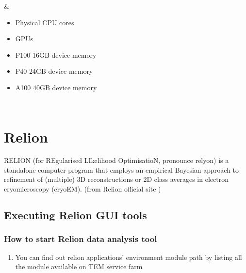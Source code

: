 \documentclass[a4paper,10pt,english]{sphinxmanual}
\begin{document}
\begin{savenotes}
\begin{tabular}[t]{*{4}{}}
\begin{itemize}
\end{itemize}
&\begin{itemize}
\item {} 
 Physical CPU cores

\item {} 
 GPUs

\item {} 
\sphinxAtStartPar
P100 16GB device memory

\item {} 
\sphinxAtStartPar
P40 24GB device memory

\item {} 
\sphinxAtStartPar
A100 40GB device memory

\end{itemize}
\\
\sphinxbottomrule
\end{tabular}
\sphinxtableafterendhook\par
\sphinxattableend\end{savenotes}

\sphinxstepscope


\chapter{Relion}
\label{\detokenize{relion:relion}}\label{\detokenize{relion::doc}}
\sphinxAtStartPar
RELION (for REgularised LIkelihood OptimisatioN, pronounce rely\sphinxhyphen{}on) is a stand\sphinxhyphen{}alone computer program that employs an empirical Bayesian approach to refinement of (multiple) 3D reconstructions or 2D class averages in electron cryo\sphinxhyphen{}microscopy (cryo\sphinxhyphen{}EM). (from Relion official site )


\section{Executing Relion GUI tools}
\label{\detokenize{relion:executing-relion-gui-tools}}

\subsection{How to start Relion data analysis tool}
\label{\detokenize{relion:how-to-start-relion-data-analysis-tool}}\begin{enumerate}
%
\item {} 
\sphinxAtStartPar
You can find out relion applications’ environment module path by listing all the module available on TEM service farm

\end{enumerate}
\end{document}
